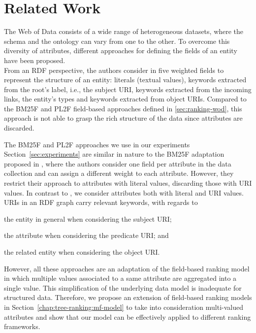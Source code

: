 \section{Related Work}
\label{sec:searching:relwork}

The Web of Data consists of a wide range of heterogeneous datasets, where the schema and the ontology can vary from one to the other. To overcome this diversity of attributes, different approaches for defining the fields of an entity have been proposed.\\

From an RDF perspective, the authors consider in \cite{Perez-Aguera:2010:UBS} five weighted fields to represent the structure of an entity: literals (textual values), keywords extracted from the root's label, i.e., the subject URI, keywords extracted from the incoming links, the entity's types and keywords extracted from object URIs. Compared to the BM25F and PL2F field-based approaches defined in \ref{sec:ranking-wod}, this approach is not able to grasp the rich structure of the data since attributes are discarded.

The BM25F and PL2F approaches we use in our experiments Section~\ref{sec:experiments} are similar in nature to the BM25F adaptation proposed in \cite{blanco:2011:iswc}, where the authors consider one field per attribute in the data collection and can assign a different weight to each attribute. However, they restrict their approach to attributes with literal values, discarding those with URI values. In contrast to \cite{blanco:2011:iswc}, we consider attributes both with literal and URI values. URIs in an RDF graph carry relevant keywords, with regards to
\begin{inparaenum}[(1)]
	\item the entity in general when considering the subject URI;
	\item the attribute when considering the predicate URI; and
	\item the related entity when considering the object URI.\\
\end{inparaenum}

However, all these approaches are an adaptation of the field-based ranking model in which multiple values associated to a same attribute are aggregated into a single value. This simplification of the underlying data model is inadequate for structured data. Therefore, we propose an extension of field-based ranking models in Section~\ref{chap:tree-ranking:mf-model} to take into consideration multi-valued attributes and show that our model can be effectively applied to different ranking frameworks.

